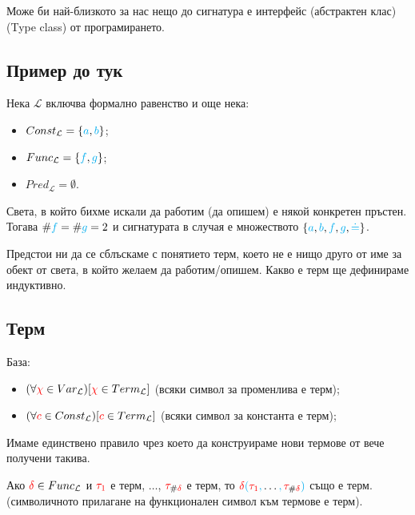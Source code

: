 \documentclass{article}[12pt]
\newcommand{\Lang}{\mathcal{L}}
\begin{document}
Може би най-близкото за нас нещо до сигнатура е интерфейс (абстрактен клас) (Type class) от програмирането.

\subsection{Пример до тук}

Нека \(\Lang\) включва формално равенство и още нека:

\begin{itemize}
\item \(Const_\Lang = \{\color{cyan}a \color{black}, \color{cyan} b \color{black} \}\);
\item \(Func_\Lang = \{\color{cyan}f \color{black}, \color{cyan} g \color{black} \}\);
\item \(Pred_\Lang = \emptyset\).
\end{itemize}

Света, в който бихме искали да работим (да опишем) е някой конкретен пръстен.
Тогава \(\#\color{cyan}f \color{black} = \#\color{cyan}g \color{black} = 2\) и сигнатурата в случая е множеството
\(\{\color{cyan}a \color{black}, \color{cyan} b \color{black} , \color{cyan} f \color{black} , \color{cyan} g \color{black} , \color{cyan} \doteq \color{black} \}\).

Предстои ни да се сблъскаме с понятието терм,
което не е нищо друго от име за обект от света,
в който желаем да работим/опишем.
Какво е терм ще дефинираме индуктивно.

\subsection{Терм}

База:

\begin{itemize}
\item \((\forall \color{red} \chi \color{black} \in Var_\Lang)[\color{red} \chi \color{black} \in Term_\Lang]\) (всяки символ за променлива е терм);
\item \((\forall \color{red} c \color{black} \in Const_\Lang)[\color{red} c \color{black} \in Term_\Lang]\) (всяки символ за константа е терм);
\end{itemize}

Имаме единствено правило чрез което да конструираме нови термове от вече получени такива.

\vspace{0.5cm}

Ако \(\color{red} \delta \color{black} \in Func_\Lang\) и \(\color{red}\tau_1\) е терм, \(\dots\), \(\color{red}\tau_{\color{black}\#\color{red}\delta}\) е терм, то
\(\color{red} \delta \color{cyan} (\color{red}\tau_1 \color{cyan} , \color{black} \dots \color{cyan} , \color{red} \tau_{\color{black}\#\color{red}\delta} \color{cyan} )\) също е терм.
(символичното прилагане на функционален символ към термове е терм).
\end{document}
